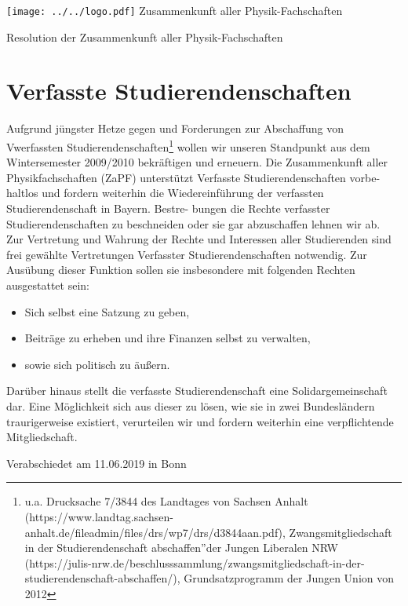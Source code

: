 \documentclass[DIV=calc]{scrartcl}
\begin{document}
    \hspace{0.87\textwidth}
    \begin{minipage}{120pt}
        \vspace{-1.8cm}
        \texttt{[image: ../../logo.pdf]}
        \centering
        \small Zusammenkunft aller Physik-Fachschaften
    \end{minipage}
    \begin{center}
        \huge{Resolution der Zusammenkunft aller Physik-Fachschaften}\vspace{.25\baselineskip}\\
        \normalsize
    \end{center}
    \vspace{1cm}

\section*{Verfasste Studierendenschaften}
Aufgrund jüngster Hetze gegen und Forderungen zur Abschaffung von Vwerfassten Studierendenschaften\footnote{u.a. Drucksache 7/3844 des Landtages von Sachsen Anhalt (https://www.landtag.sachsen-anhalt.de/fileadmin/files/drs/wp7/drs/d3844aan.pdf), Zwangsmitgliedschaft in der Studierendenschaft abschaffen”der Jungen Liberalen NRW (https://julis-nrw.de/beschlusssammlung/zwangsmitgliedschaft-in-der-studierendenschaft-abschaffen/), Grundsatzprogramm der Jungen Union von 2012} wollen wir unseren Standpunkt aus dem Wintersemester 2009/2010 bekräftigen und erneuern.
Die Zusammenkunft aller Physikfachschaften (ZaPF) unterstützt Verfasste Studierendenschaften vorbe-
haltlos und fordern weiterhin die Wiedereinführung der verfassten Studierendenschaft in Bayern. Bestre-
bungen die Rechte verfasster Studierendenschaften zu beschneiden oder sie gar abzuschaffen lehnen wir
ab.\\
Zur Vertretung und Wahrung der Rechte und Interessen aller Studierenden sind frei gewählte Vertretungen
Verfasster Studierendenschaften notwendig. Zur Ausübung dieser Funktion sollen sie insbesondere mit
folgenden Rechten ausgestattet sein:\\
\begin{itemize}
\item Sich selbst eine Satzung zu geben,
\item Beiträge zu erheben und ihre Finanzen selbst zu verwalten,
\item sowie sich politisch zu äußern.
\end{itemize}
Darüber hinaus stellt die verfasste Studierendenschaft eine Solidargemeinschaft dar. Eine Möglichkeit sich
aus dieser zu lösen, wie sie in zwei Bundesländern traurigerweise existiert, verurteilen wir und fordern
weiterhin eine verpflichtende Mitgliedschaft.\\


\vspace*{\fill}
\begin{flushright}
Verabschiedet am 11.06.2019 in Bonn
\end{flushright}
\end{document}
